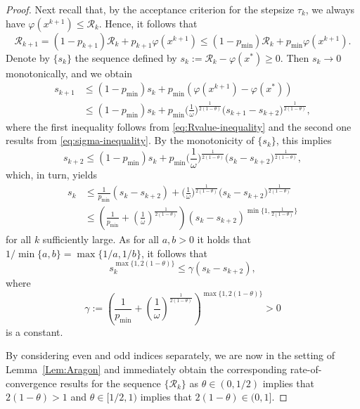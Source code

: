 \documentclass[a4paper, 12pt]{article}
\numberwithin{equation}{section}
\theoremstyle{bolddef}
\theoremstyle{definition}
\theoremstyle{boldplain}
\newcommand{\tauk}{\tau_k}
\newcommand{\xkp}{x^{k+1}}
\newcommand{\pmin}{p_{\min}}
\newcommand{\Rvalue}{\mathcal{R}}
\begin{document}
\begin{proof}
Next recall that, by the acceptance criterion for the stepsize
$ \tauk $, we always have $ \varphi(\xkp) \leq \Rvalue_k $.
Hence, it follows that
\begin{equation}\label{eq:Rvalue-inequality}
	\Rvalue_{k+1} = (1-p_{k+1}) \Rvalue_k + p_{k+1} \varphi(\xkp) \leq (1-\pmin) \Rvalue_k + \pmin \varphi(\xkp).
\end{equation}
Denote by $\{s_k\}$ the sequence defined by $s_k := \Rvalue_k - \varphi(x^*)
\geq 0 $. Then $ s_k \to 0 $ monotonically, and we obtain
\begin{align*}
	s_{k+1} &\leq (1-\pmin) s_k + \pmin(\varphi(\xkp) - \varphi(x^*))\\
			&\leq (1-\pmin)s_k + \pmin \Big(\frac{1}{\omega}\Big)^{\frac{1}{2(1-\theta)}} \big( s_{k+1} - s_{k+2} \big)^{\frac{1}{2(1-\theta)}} ,
\end{align*}
where the first inequality follows from \eqref{eq:Rvalue-inequality}
and the second one results from \eqref{eq:sigma-inequality}.
	By the monotonicity of $\{s_k\}$, this implies
\begin{equation*}
	s_{k+2} \leq (1- \pmin) s_k + \pmin \Big(\frac{1}{\omega}\Big)^{\frac{1}{2(1-\theta)}} \big( s_{k} - s_{k+2} \big)^{\frac{1}{2(1-\theta)}},
\end{equation*}
which, in turn, yields
\begin{align*}
s_k &\leq \frac{1}{\pmin} (s_k -s_{k+2}) + \Big(\frac{1}{\omega}\Big)^{\frac{1}{2(1-\theta)}} \big( s_k - s_{k+2} \big)^{\frac{1}{2(1-\theta)}}\\
	&\leq \left(\frac{1}{\pmin} + \left(\frac{1}{\omega}\right)^{\frac{1}{2(1-\theta)}}\right) (s_k - s_{k+2})^{\min\{1, \frac{1}{2(1-\theta)}\}}
\end{align*}
for all $ k $ sufficiently large.
As for all $a, b > 0$ it holds that $1/\min\{a, b\} = \max\{1/a, 1/b\}$, it follows that
\begin{equation*}
s_k^{\max\{1, 2(1-\theta)\}} \leq \gamma (s_k - s_{k+2}),
\end{equation*}
where 
\begin{equation*}
\gamma := \left(\frac{1}{\pmin} + \left(\frac{1}{\omega}\right)^{\frac{1}{2(1-\theta)}}\right)^{\max\{1, 2(1-\theta)\}} > 0
\end{equation*}
is a constant.

By considering even and odd indices separately, we are now in the setting of Lemma~\ref{Lem:Aragon} and immediately obtain the 
corresponding rate-of-convergence results for the sequence $\{\Rvalue_k\}$ as $\theta \in (0, 1/2)$ implies that $2(1-\theta) > 1$ and $\theta \in [1/2, 1)$ implies that $2(1-\theta) \in (0, 1]$.


\end{proof}
\end{document}
